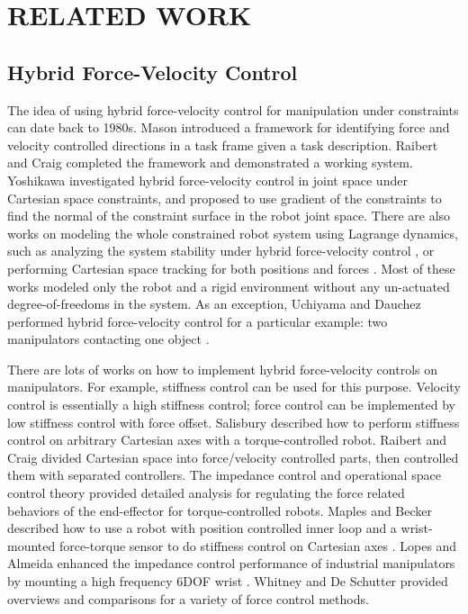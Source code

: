 
\section{RELATED WORK}
\label{sec:related_work}

\subsection{Hybrid Force-Velocity Control} %
\label{sub:hybrid_force_velocity_control}
The idea of using hybrid force-velocity control for manipulation under constraints can date back to 1980s.
Mason \cite{mason1981compliance} introduced a framework for identifying force and velocity controlled directions in a task frame given a task description. Raibert and Craig \cite{raibert1981hybrid} completed the framework and demonstrated a working system.
Yoshikawa \cite{yoshikawa1987dynamic} investigated hybrid force-velocity control in joint space under Cartesian space constraints, and proposed to use gradient of the constraints to find the normal of the constraint surface in the robot joint space.
There are also works on modeling the whole constrained robot system using Lagrange dynamics, such as analyzing the system stability under hybrid force-velocity control \cite{mcclamroch1988feedback}, or performing Cartesian space tracking for both positions and forces \cite{mills1989force}. Most of these works modeled only the robot and a rigid environment without any un-actuated degree-of-freedoms in the system. As an exception, Uchiyama and Dauchez performed hybrid force-velocity control for a particular example: two manipulators contacting one object \cite{uchiyama1988symmetric}.

There are lots of works on how to implement hybrid force-velocity controls on manipulators. For example, stiffness control can be used for this purpose. Velocity control is essentially a high stiffness control; force control can be implemented by low stiffness control with force offset.
Salisbury \cite{salisbury1980active} described how to perform stiffness control on arbitrary Cartesian axes with a torque-controlled robot.
Raibert and Craig \cite{raibert1981hybrid} divided Cartesian space into force/velocity controlled parts, then controlled them with separated controllers.
The impedance control \cite{hogan1985impedance}  and operational space control \cite{khatib1987unified} theory provided detailed analysis for regulating the force related behaviors of the end-effector for torque-controlled robots. Maples and Becker described how to use a robot with position controlled inner loop and a wrist-mounted force-torque sensor to do stiffness control on Cartesian axes \cite{maples1986experiments}. Lopes and Almeida enhanced the impedance control performance of industrial manipulators by mounting a high frequency 6DOF wrist \cite{lopes2008force}. Whitney \cite{whitney1987historical} and De Schutter \cite{de1998force} provided overviews and comparisons for a variety of force control methods.

